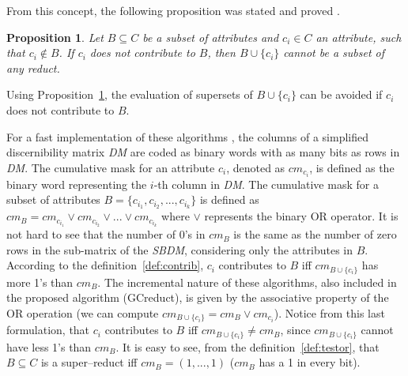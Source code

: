 \documentclass[number,preprint,review,12pt]{elsarticle}
\newtheorem{proposition}{Proposition}
\newtheorem{corollary}{Corollary}
\begin{document}
	From this concept, the following proposition was stated and proved \cite{Sanchez07}.
			
	\begin{proposition}\label{prop:contrib} 
		Let $B \subseteq C$ be a subset of attributes and $c_i \in C$ an attribute, such that $c_i \notin B$. If $c_i$ does not contribute to $B$, then $B\cup\{c_i\}$ cannot be a subset of any reduct.
	\end{proposition}
	
	Using Proposition~\ref{prop:contrib}, the evaluation of supersets of $B\cup\{c_i\}$ can be avoided if $c_i$ does not contribute to $B$.
	
	
	For a fast implementation of these algorithms \citep{Sanchez10,Lias13}, the columns of a simplified discernibility matrix \textit{DM} are coded as binary words with as many bits as rows in \textit{DM}. The cumulative mask for an attribute $c_i$, denoted as $cm_{c_i}$, is defined as the binary word representing the $i$-th column in \textit{DM}. The cumulative mask for a subset of attributes $B=\lbrace c_{i_1},c_{i_2},...,c_{i_k} \rbrace$ is defined	as $cm_B = cm_{c_{i_1}} \vee cm_{c_{i_2}} \vee ... \vee cm_{c_{i_k}}$ where $\vee$ represents the binary OR operator. It is not hard to see that the number of 0's in $cm_B$ is the same as the number of zero rows in the sub-matrix of the \textit{SBDM}, considering only the attributes in $B$. According to the definition~\ref{def:contrib}, $c_i$ contributes to $B$ iff $cm_{B\cup \lbrace c_i\rbrace}$ has more 1's than $cm_B$. The incremental nature of these algorithms, also included in  the proposed algorithm (GCreduct), is given by the associative property of the OR operation (we can compute $cm_{B\cup \lbrace c_i\rbrace}=cm_B\vee cm_{c_i}$). Notice from this last formulation, that $c_i$ contributes to $B$ iff $cm_{B\cup \lbrace c_i\rbrace}\neq cm_B$, since $cm_{B\cup \lbrace c_i\rbrace}$ cannot have less 1's than $cm_B$. It is easy to see, from the definition~\ref{def:testor}, that $B \subseteq C$ is a super--reduct iff $cm_B=(1,...,1)$ ($cm_B$ has a 1 in every bit).
	
\end{document}
